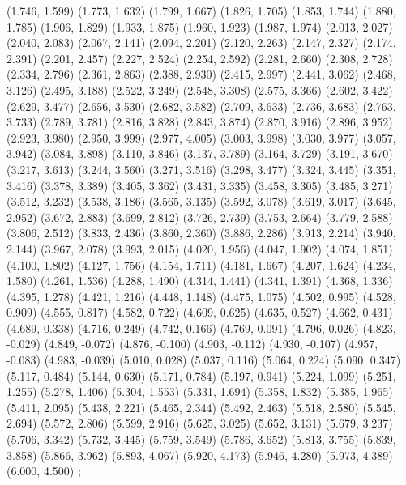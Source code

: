 {  (1.746, 1.599)
  (1.773, 1.632)
  (1.799, 1.667)
  (1.826, 1.705)
  (1.853, 1.744)
  (1.880, 1.785)
  (1.906, 1.829)
  (1.933, 1.875)
  (1.960, 1.923)
  (1.987, 1.974)
  (2.013, 2.027)
  (2.040, 2.083)
  (2.067, 2.141)
  (2.094, 2.201)
  (2.120, 2.263)
  (2.147, 2.327)
  (2.174, 2.391)
  (2.201, 2.457)
  (2.227, 2.524)
  (2.254, 2.592)
  (2.281, 2.660)
  (2.308, 2.728)
  (2.334, 2.796)
  (2.361, 2.863)
  (2.388, 2.930)
  (2.415, 2.997)
  (2.441, 3.062)
  (2.468, 3.126)
  (2.495, 3.188)
  (2.522, 3.249)
  (2.548, 3.308)
  (2.575, 3.366)
  (2.602, 3.422)
  (2.629, 3.477)
  (2.656, 3.530)
  (2.682, 3.582)
  (2.709, 3.633)
  (2.736, 3.683)
  (2.763, 3.733)
  (2.789, 3.781)
  (2.816, 3.828)
  (2.843, 3.874)
  (2.870, 3.916)
  (2.896, 3.952)
  (2.923, 3.980)
  (2.950, 3.999)
  (2.977, 4.005)
  (3.003, 3.998)
  (3.030, 3.977)
  (3.057, 3.942)
  (3.084, 3.898)
  (3.110, 3.846)
  (3.137, 3.789)
  (3.164, 3.729)
  (3.191, 3.670)
  (3.217, 3.613)
  (3.244, 3.560)
  (3.271, 3.516)
  (3.298, 3.477)
  (3.324, 3.445)
  (3.351, 3.416)
  (3.378, 3.389)
  (3.405, 3.362)
  (3.431, 3.335)
  (3.458, 3.305)
  (3.485, 3.271)
  (3.512, 3.232)
  (3.538, 3.186)
  (3.565, 3.135)
  (3.592, 3.078)
  (3.619, 3.017)
  (3.645, 2.952)
  (3.672, 2.883)
  (3.699, 2.812)
  (3.726, 2.739)
  (3.753, 2.664)
  (3.779, 2.588)
  (3.806, 2.512)
  (3.833, 2.436)
  (3.860, 2.360)
  (3.886, 2.286)
  (3.913, 2.214)
  (3.940, 2.144)
  (3.967, 2.078)
  (3.993, 2.015)
  (4.020, 1.956)
  (4.047, 1.902)
  (4.074, 1.851)
  (4.100, 1.802)
  (4.127, 1.756)
  (4.154, 1.711)
  (4.181, 1.667)
  (4.207, 1.624)
  (4.234, 1.580)
  (4.261, 1.536)
  (4.288, 1.490)
  (4.314, 1.441)
  (4.341, 1.391)
  (4.368, 1.336)
  (4.395, 1.278)
  (4.421, 1.216)
  (4.448, 1.148)
  (4.475, 1.075)
  (4.502, 0.995)
  (4.528, 0.909)
  (4.555, 0.817)
  (4.582, 0.722)
  (4.609, 0.625)
  (4.635, 0.527)
  (4.662, 0.431)
  (4.689, 0.338)
  (4.716, 0.249)
  (4.742, 0.166)
  (4.769, 0.091)
  (4.796, 0.026)
  (4.823, -0.029)
  (4.849, -0.072)
  (4.876, -0.100)
  (4.903, -0.112)
  (4.930, -0.107)
  (4.957, -0.083)
  (4.983, -0.039)
  (5.010, 0.028)
  (5.037, 0.116)
  (5.064, 0.224)
  (5.090, 0.347)
  (5.117, 0.484)
  (5.144, 0.630)
  (5.171, 0.784)
  (5.197, 0.941)
  (5.224, 1.099)
  (5.251, 1.255)
  (5.278, 1.406)
  (5.304, 1.553)
  (5.331, 1.694)
  (5.358, 1.832)
  (5.385, 1.965)
  (5.411, 2.095)
  (5.438, 2.221)
  (5.465, 2.344)
  (5.492, 2.463)
  (5.518, 2.580)
  (5.545, 2.694)
  (5.572, 2.806)
  (5.599, 2.916)
  (5.625, 3.025)
  (5.652, 3.131)
  (5.679, 3.237)
  (5.706, 3.342)
  (5.732, 3.445)
  (5.759, 3.549)
  (5.786, 3.652)
  (5.813, 3.755)
  (5.839, 3.858)
  (5.866, 3.962)
  (5.893, 4.067)
  (5.920, 4.173)
  (5.946, 4.280)
  (5.973, 4.389)
  (6.000, 4.500)
};
